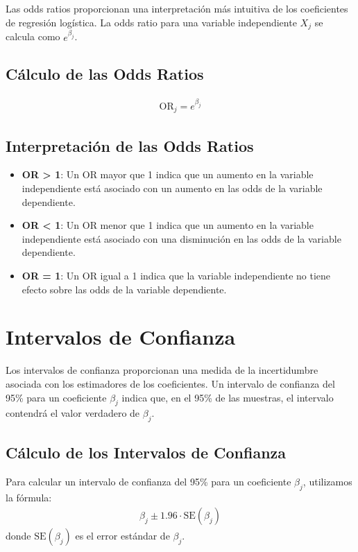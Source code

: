 Las odds ratios proporcionan una interpretaci\'on m\'as intuitiva de los coeficientes de regresi\'on log\'istica. La odds ratio para una variable independiente $X_j$ se calcula como $e^{\beta_j}$.

\subsection{C\'alculo de las Odds Ratios}

\begin{eqnarray*}
\text{OR}_j = e^{\beta_j}
\end{eqnarray*}

\subsection{Interpretaci\'on de las Odds Ratios}

\begin{itemize}
    \item \textbf{OR > 1}: Un OR mayor que 1 indica que un aumento en la variable independiente est\'a asociado con un aumento en las odds de la variable dependiente.
    \item \textbf{OR < 1}: Un OR menor que 1 indica que un aumento en la variable independiente est\'a asociado con una disminuci\'on en las odds de la variable dependiente.
    \item \textbf{OR = 1}: Un OR igual a 1 indica que la variable independiente no tiene efecto sobre las odds de la variable dependiente.
\end{itemize}

\section{Intervalos de Confianza}

Los intervalos de confianza proporcionan una medida de la incertidumbre asociada con los estimadores de los coeficientes. Un intervalo de confianza del 95\% para un coeficiente $\beta_j$ indica que, en el 95\% de las muestras, el intervalo contendr\'a el valor verdadero de $\beta_j$.

\subsection{C\'alculo de los Intervalos de Confianza}

Para calcular un intervalo de confianza del 95\% para un coeficiente $\beta_j$, utilizamos la f\'ormula:
\begin{eqnarray*}
\beta_j \pm 1.96 \cdot \text{SE}(\beta_j)
\end{eqnarray*}
donde $\text{SE}(\beta_j)$ es el error est\'andar de $\beta_j$.

